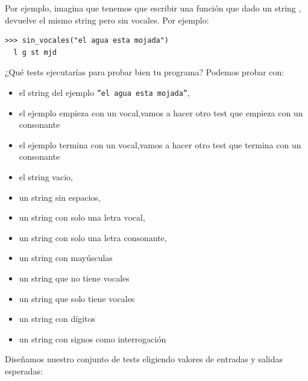 Por ejemplo, imagina que tenemos que escribir una función  que dado un string , devuelve el mismo string  pero sin vocales. Por ejemplo:\\

\begin{Verbatim}[frame=single, label = {\em ejemplo de ejecución}]
>>> sin_vocales("el agua esta mojada")
  l g st mjd
\end{Verbatim}

¿Qué tests ejecutarías para probar bien tu programa? Podemos probar con:

\begin{itemize}[nosep]
    \item el string del ejemplo \texttt{''el agua esta mojada''}, 
    \item el ejemplo empieza con un vocal,vamos a hacer otro test que empieza con un consonante
    \item el ejemplo termina con un vocal,vamos a hacer otro test que termina con un consonante
    \item el string vacio,
     \item un string sin espacios,
    \item un string con solo una letra vocal,
     \item un string con solo una letra consonante,
    \item un string con mayúsculas
    \item un string que no tiene vocales
    \item un string que solo tiene vocales
    \item un string con dígitos
    \item un string con signos como interrogación
\end{itemize}

Diseñamos nuestro conjunto de tests eligiendo valores de entradas y salidas esperadas:


